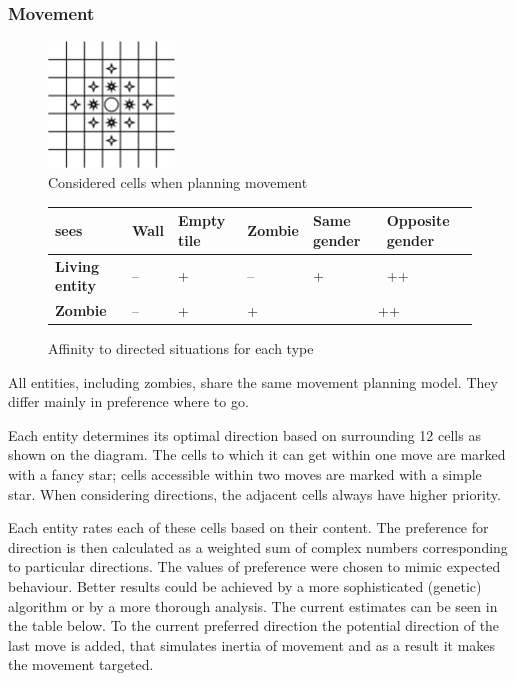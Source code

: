 \documentclass[a4paper]{article}
\begin{document}
\subsubsection{Movement}

\begin{figure}[ht]
    \centering
    \includegraphics[width=0.3\textwidth]{movement}
    \caption{Considered cells when planning movement}
\end{figure}

\begin{figure}[ht]
    \centering
    \begin{tabu} {| X[1.8,c,p] || X[1,c,p] | X[1,c,p] | X[1,c,p] | X[1,c,p] | X[1.2,c,p] |}
        \rowfont{\bfseries}
        \hline
        sees &
        Wall\footnotemark &
        Empty tile&
        Zombie &
        Same gender &
        Opposite gender \\
        \hline
        \hline
        \textbf{Living entity} & -- & + & -- & + & ++ \\
        \hline
        \textbf{Zombie} & -- & + & + &  \\
        \hline
    \end{tabu}
    \caption{Affinity to directed situations for each type}
\end{figure}

All entities, including zombies, share the same movement planning model.
They differ mainly in preference where to go.

Each entity determines its optimal direction based on surrounding 12 cells as shown on the diagram.
The cells to which it can get within one move are marked with a fancy star; cells accessible within two moves are marked with a simple star.
When considering directions, the adjacent cells always have higher priority.

Each entity rates each of these cells based on their content.
The preference for direction is then calculated as a weighted sum of complex numbers corresponding to particular directions.
The values of preference were chosen to mimic expected behaviour.
Better results could be achieved by a more sophisticated (genetic) algorithm or by a more thorough analysis.
The current estimates can be seen in the table below.
To the current preferred direction the potential direction of the last move is added, that simulates inertia of movement and as a result it makes the movement targeted.
\end{document}
